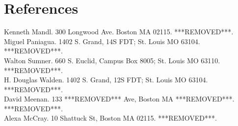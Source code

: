 \documentclass[12pt]{article}
\begin{document}
\section{References}
Kenneth Mandl. 300 Longwood Ave. Boston MA 02115. ***REMOVED***.\\
Miguel Paniagua. 1402 S. Grand, 14S FDT; St. Louis MO 63104.
***REMOVED***.\\
Walton Sumner. 660 S. Euclid, Campus Box 8005; St. Louis MO 63110.
***REMOVED***.\\
H. Douglas Walden. 1402 S. Grand, 12S FDT; St. Louis MO 63104.
***REMOVED***.\\
David Meenan. 133 ***REMOVED*** Ave, Boston MA ***REMOVED***. ***REMOVED***.\\
Alexa McCray. 10 Shattuck St, Boston MA 02115. ***REMOVED***.\\
\end{document}
